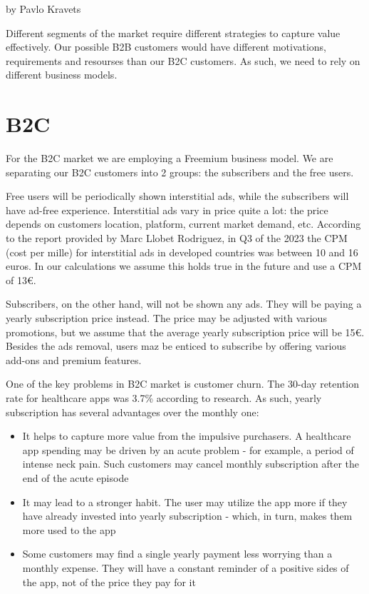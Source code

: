 by Pavlo Kravets


Different segments of the market require different strategies to capture value effectively. Our possible B2B customers would have different motivations, requirements and resourses than our B2C customers. As such, we need to rely on different business models.

\section{B2C}

For the B2C market we are employing a Freemium business model. We are separating our B2C customers into 2 groups: the subscribers and the free users.

Free users will be periodically shown interstitial ads, while the subscribers will have ad-free experience. Interstitial ads vary in price quite a lot: the price depends on customers location, platform, current market demand, etc. According to the report provided by Marc Llobet Rodriguez\cite{ECPM}, in Q3 of the 2023 the CPM (cost per mille) for interstitial ads in developed countries was between 10 and 16 euros. In our calculations we assume this holds true in the future and use a CPM of 13€.

Subscribers, on the other hand, will not be shown any ads. They will be paying a yearly subscription price instead. The price may be adjusted with various promotions, but we assume that the average yearly subscription price will be 15€. Besides the ads removal, users maz be enticed to subscribe by offering various add-ons and premium features.

One of the key problems in B2C market is customer churn. The 30-day retention rate for healthcare apps was 3.7\% according to research\cite{churn}. As such, yearly subscription has several advantages over the monthly one:
\begin{itemize}
    \item It helps to capture more value from the impulsive purchasers. A healthcare app spending may be driven by an acute problem - for example, a period of intense neck pain. Such customers may cancel monthly subscription after the end of the acute episode
    \item It may lead to a stronger habit. The user may utilize the app more if they have already invested into yearly subscription - which, in turn, makes them more used to the app
    \item Some customers may find a single yearly payment less worrying than a monthly expense. They will have a constant reminder of a positive sides of the app, not of the price they pay for it
\end{itemize}


